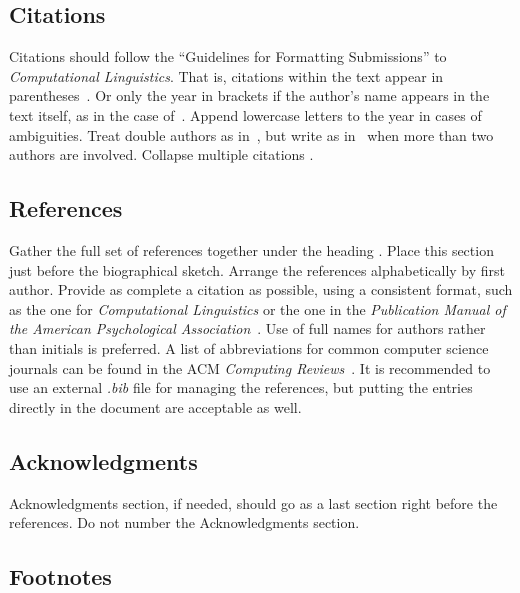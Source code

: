 \documentclass[10pt, a4paper]{article}
\begin{document}
\subsection{Citations}
\label{subsec:citations}

Citations should follow the \enquote{Guidelines for Formatting Submissions} to \emph{Computational Linguistics}.
That is, citations within the text appear in parentheses~\citep{gusfield1997algorithms}.
Or only the year in brackets if the author's name appears in the text itself, as in the case of~\citet{gusfield1997algorithms}.
Append lowercase letters to the year in cases of ambiguities.
Treat double authors as in~\citet{aho1972theory}, but write as in~\citet{chandra1981embedded} when more than two authors are involved.
Collapse multiple citations \citep{wagner1974string, chandra1981embedded}.

\subsection{References}
\label{subsec:references}

Gather the full set of references together under the
heading \textbf{}.
Place this section just before the biographical sketch.
Arrange the references alphabetically by first author.
Provide as complete a citation as possible, using a consistent format, such as the one for \emph{Computational
Linguistics} or the one in the {\emph{Publication Manual of the American 
Psychological Association}~\citep{american1994publication}}.
Use of full names for authors rather than initials is preferred.
A list of abbreviations for common computer science journals can be found in the ACM \emph{Computing
Reviews}~\citep{american1994publication}.
It is recommended to use an external \textit{.bib} file for managing the references, but putting the entries directly in the document are acceptable as well.

\subsection{Acknowledgments}
\label{subsec:acknowledgments}

Acknowledgments section, if needed, should go as a last section right before the references.
Do not number the Acknowledgments section.

\subsection{Footnotes}
\label{subsec:footnotes}
\end{document}
